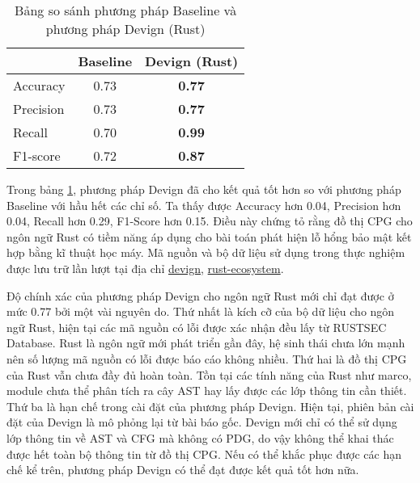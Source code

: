 \begin{table}[H]
    \centering
    \caption{Bảng so sánh phương pháp Baseline và phương pháp Devign (Rust)}
    \label{table:c5_ml}
    \begin{tabular}{l @{\hskip 3cm} c @{\hskip 3cm} c}
        \hline
         & Baseline & \textbf{Devign (Rust)} \\
        \hline
        Accuracy & 0.73 & \textbf{0.77} \\
        Precision & 0.73 & \textbf{0.77} \\
        Recall & 0.70 & \textbf{0.99} \\
        F1-score & 0.72 & \textbf{0.87} \\
        \hline
    \end{tabular}
\end{table}

Trong bảng \ref{table:c5_ml}, phương pháp Devign đã cho kết quả tốt hơn so với phương pháp Baseline với hầu hết các chỉ số.
Ta thấy được Accuracy hơn 0.04, Precision hơn 0.04, Recall hơn 0.29, F1-Score hơn 0.15.
Điều này chứng tỏ rằng đồ thị CPG cho ngôn ngữ Rust có tiềm năng áp dụng cho bài toán phát hiện lỗ hổng bảo mật kết hợp bằng kĩ thuật học máy.
Mã nguồn và bộ dữ liệu sử dụng trong thực nghiệm được lưu trữ lần lượt tại địa chỉ \href{https://github.com/congnghiahieu/devign}{devign}, \href{https://github.com/congnghiahieu/rust-ecosystem}{rust-ecosystem}.

Độ chính xác của phương pháp Devign cho ngôn ngữ Rust mới chỉ đạt được ở mức 0.77 bởi một vài nguyên do.
Thứ nhất là kích cỡ của bộ dữ liệu cho ngôn ngữ Rust, hiện tại các mã nguồn có lỗi được xác nhận đều lấy từ RUSTSEC Database.
Rust là ngôn ngữ mới phát triển gần đây, hệ sinh thái chưa lớn mạnh nên số lượng mã nguồn có lỗi được báo cáo không nhiều.
Thứ hai là đồ thị CPG của Rust vẫn chưa đầy đủ hoàn toàn.
Tồn tại các tính năng của Rust như marco, module chưa thể phân tích ra cây AST hay lấy được các lớp thông tin cần thiết.
Thứ ba là hạn chế trong cài đặt của phương pháp Devign.
Hiện tại, phiên bản cài đặt của Devign là mô phỏng lại từ bài báo gốc.
Devign mới chỉ có thể sử dụng lớp thông tin về AST và CFG mà không có PDG, do vậy không thể khai thác được hết toàn bộ thông tin từ đồ thị CPG.
Nếu có thể khắc phục được các hạn chế kể trên, phương pháp Devign có thể đạt được kết quả tốt hơn nữa.

